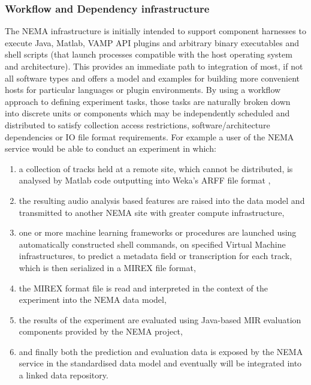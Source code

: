 \documentclass[conference]{IEEEtran}
\begin{document}
\subsubsection{Workflow and Dependency infrastructure}
The NEMA infrastructure is initially intended to support component harnesses to execute Java, Matlab, VAMP API plugins \cite{cannam2006sonic} and arbitrary binary executables and shell scripts (that launch processes compatible with the host operating system and architecture). This provides an immediate path to integration of most, if not all software types and offers a model and examples for building more convenient hosts for particular languages or plugin environments.
By using a workflow approach to defining experiment tasks, those tasks are naturally broken down into discrete units or components which may be independently scheduled and distributed to satisfy collection access restrictions, software/architecture dependencies or IO file format requirements. For example a user of the NEMA service would be able to conduct an experiment in which:
\begin{enumerate}
\item a collection of tracks held at a remote site, which cannot be distributed, is analysed by Matlab code outputting into Weka's ARFF file format \cite{witten1999wpm}, 
\item the resulting audio analysis based features are raised into the data model and transmitted to another NEMA site with greater compute infrastructure, 
\item one or more machine learning frameworks or procedures are launched using automatically constructed shell commands, on specified Virtual Machine infrastructures, to predict a metadata field or transcription for each track, which is then serialized in a MIREX file format,
\item the MIREX format file is read and interpreted in the context of the experiment into the NEMA data model,
\item the results of the experiment are evaluated using Java-based MIR evaluation components provided by the NEMA project,
\item and finally both the prediction and evaluation data is exposed by the NEMA service in the standardised data model and eventually will be integrated into a linked data repository.
\end{enumerate}
\end{document}
